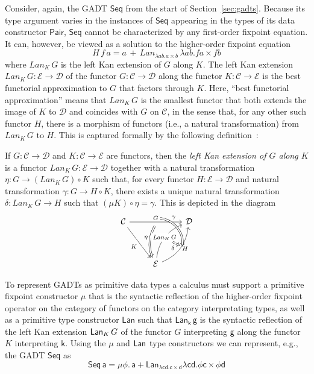 \documentclass[acmsmall,screen,review,anonymous]{acmart}
\theoremstyle{definition}
\newcommand{\cal}{\mathcal}
\begin{document}
Consider, again, the GADT $\mathsf{Seq}$ from the start of
Section~\ref{sec:gadts}. Because its type argument varies in the
instances of $\mathsf{Seq}$ appearing in the types of its data
constructor $\mathsf{Pair}$, $\mathsf{Seq}$ cannot be characterized by
any first-order fixpoint equation. It can, however, be viewed as a
solution to the higher-order fixpoint equation
\[H\,f\,a = a \,+\,Lan_{\lambda a b. a \times b}\, \lambda
a b. f a \times f b\] where $Lan_K \,G$ is the left Kan extension of
$G$ along $K$.  The left Kan extension $Lan_K \,G : {\cal E} \to
{\cal D}$ of the functor $G : {\cal C} \to {\cal D}$ along the functor
$K : {\cal C} \to {\cal E}$ is the best functorial approximation to
$G$ that factors through $K$. Here, ``best functorial approximation''
means that $Lan_K \,G$ is the smallest functor that both extends the
image of $K$ to $\cal D$ and coincides with $G$ on $\cal C$, in the
sense that, for any other such functor $H$, there is a morphism of
functors (i.e., a natural transformation) from $Lan_K \,G$ to
$H$. This is captured formally by the following
definition~\cite{mac71}:
\begin{definition}\label{def:lke}
If $G : {\cal C} \to {\cal D}$ and $K : {\cal C} \to {\cal E}$ are
functors, then the {\em left Kan extension of $G$ along $K$} is a
functor $\mathit{Lan}_K\,G : {\cal E} \to {\cal D}$ together with a
natural transformation $\eta : G \to (\mathit{Lan}_K\,G) \circ K$
such that, for every functor $H : {\cal E} \to {\cal D}$ and natural
transformation $\gamma : G \to H \circ K$, there exists a unique
natural transformation $\delta : \mathit{Lan}_K\,G \to H$ such that $(\mu
K) \circ \eta = \gamma$. This is depicted in the diagram
\[\begin{tikzcd}[row sep = huge]
{\cal C}
\ar[rr, "{G}"{name=Fa, above}, ""{name=F, below}]
\ar[rd, "{K}"']
&& {\cal D} \\
& {\cal E}
\ar[Rightarrow, bend right = 25, from=F, "{\eta}"']
\ar[ur, bend left, "{\mathit{Lan}_{K}\,G}"{name=Lan, description}]
\ar[ur, bend right, "{H}"'{name=L, right}, ""'{name=Lr, right}]
\ar[Rightarrow, bend left = 45, from=Fa, to=Lr, "{\gamma}" near start]
\ar[Rightarrow, dashed, from=Lan, to=L, "{\delta}"']
\end{tikzcd}\]
\end{definition}

To represent GADTs as primitive data types a calculus must support a
primitive fixpoint constructor $\mathsf{\mu}$ that is the syntactic
reflection of the higher-order fixpoint operator on the category of
functors on the category interpretating types, as well as a primitive
type constructor $\mathsf{Lan}$ such that $\mathsf{Lan_k\,g}$ is the
syntactic reflection of the left Kan extension $\mathsf{Lan}_K \,G$ of the
functor $G$ interpreting $\mathsf{g}$ along the functor $K$
interpreting $\mathsf{k}$. Using the $\mu$ and $\mathsf{Lan}$ type
constructors we can represent, e.g., the GADT $\mathsf{Seq}$ as
\[\mathsf{Seq\,a} = \mathsf{\mu \phi.\, a + Lan_{\lambda c d. c \times d}
  \lambda c d. \phi c \times \phi d}\]
\end{document}
